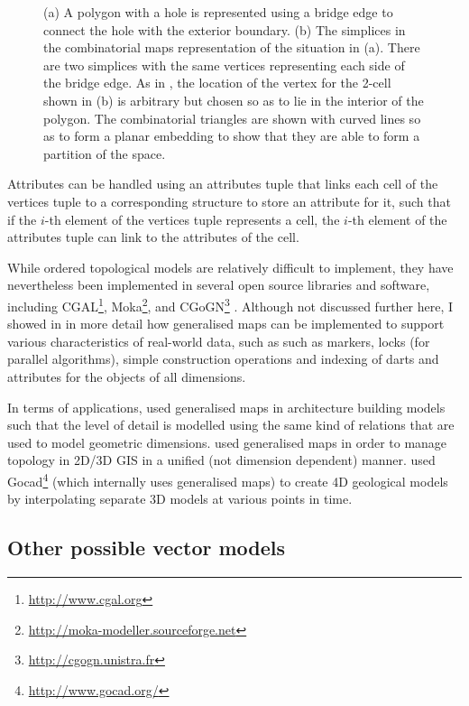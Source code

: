 \begin{figure}[tbp]
{\label{subfig:bridge-2}}
\caption[Representing holes using bridges]{(a) A polygon with a hole is represented using a bridge edge to connect the hole with the exterior boundary.
(b) The simplices in the combinatorial maps representation of the situation in (a).
There are two simplices with the same vertices representing each side of the bridge edge.
As in , the location of the vertex for the 2-cell shown in (b) is arbitrary but chosen so as to lie in the interior of the polygon.
The combinatorial triangles are shown with curved lines so as to form a planar embedding to show that they are able to form a partition of the space.}
\label{fig:bridge}
\end{figure}
Attributes can be handled using an attributes tuple that links each cell of the vertices tuple to a corresponding structure to store an attribute for it, such that if the $i$-th element of the vertices tuple represents a cell, the $i$-th element of the attributes tuple can link to the attributes of the cell.

While ordered topological models are relatively difficult to implement, they have nevertheless been implemented in several open source libraries and software, including CGAL\footnote{\url{http://www.cgal.org}}, Moka\footnote{\url{http://moka-modeller.sourceforge.net}}, and CGoGN\footnote{\url{http://cgogn.unistra.fr}} \citep{Kraemer14}.
Although not discussed further here, I showed in \citet{ArroyoOhori13a} in more detail how generalised maps can be implemented to support various characteristics of real-world data, such as such as markers, locks (for parallel algorithms), simple construction operations and indexing of darts and attributes for the objects of all dimensions.

In terms of applications, 
\citet{Fradin02} used generalised maps in architecture building models such that the level of detail is modelled using the same kind of relations that are used to model geometric dimensions.
\citet{Thomsen08} used generalised maps in order to manage topology in 2D/3D GIS in a unified (not dimension dependent) manner.
\citet{Le13} used Gocad\footnote{\url{http://www.gocad.org/}} (which internally uses generalised maps) to create 4D geological models by interpolating separate 3D models at various points in time.

\subsection{Other possible vector models}
\label{ss:vector-others}

